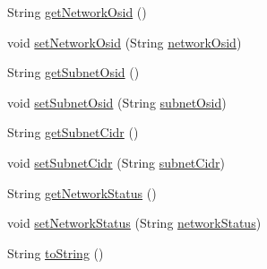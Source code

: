 \begin{DoxyCompactItemize}
\item 
String \mbox{\hyperlink{classcom_1_1example_1_1demo_1_1modular_1_1_network_a21f1cd261681f241ffc2f163c22f88ab}{get\+Network\+Osid}} ()
\item 
void \mbox{\hyperlink{classcom_1_1example_1_1demo_1_1modular_1_1_network_aad93e2b24cf4fe1a7fc86acc65037cdf}{set\+Network\+Osid}} (String \mbox{\hyperlink{classcom_1_1example_1_1demo_1_1modular_1_1_network_a653e6a71d84cc5a92ab6b4446c90b64d}{network\+Osid}})
\item 
String \mbox{\hyperlink{classcom_1_1example_1_1demo_1_1modular_1_1_network_a176a534f769a35decf7daf51ae4d99d3}{get\+Subnet\+Osid}} ()
\item 
void \mbox{\hyperlink{classcom_1_1example_1_1demo_1_1modular_1_1_network_a224f3613b5b7d28c673c18c0d3dcf19e}{set\+Subnet\+Osid}} (String \mbox{\hyperlink{classcom_1_1example_1_1demo_1_1modular_1_1_network_a2f70a4f8f85e28c37af005fe18074deb}{subnet\+Osid}})
\item 
String \mbox{\hyperlink{classcom_1_1example_1_1demo_1_1modular_1_1_network_aaee5c23adf0c0face43786b53a56e035}{get\+Subnet\+Cidr}} ()
\item 
void \mbox{\hyperlink{classcom_1_1example_1_1demo_1_1modular_1_1_network_a13ce33b2ad64cc3a93c13422a68435f8}{set\+Subnet\+Cidr}} (String \mbox{\hyperlink{classcom_1_1example_1_1demo_1_1modular_1_1_network_a77c09d06140f3d9047051d6a8033c416}{subnet\+Cidr}})
\item 
String \mbox{\hyperlink{classcom_1_1example_1_1demo_1_1modular_1_1_network_a7811054d746b90753fb1b07049dc1ac3}{get\+Network\+Status}} ()
\item 
void \mbox{\hyperlink{classcom_1_1example_1_1demo_1_1modular_1_1_network_a5dcbb1a00e86153f08747c45ba56509a}{set\+Network\+Status}} (String \mbox{\hyperlink{classcom_1_1example_1_1demo_1_1modular_1_1_network_a9c13fc86c668e502aee81251ded19368}{network\+Status}})
\item 
String \mbox{\hyperlink{classcom_1_1example_1_1demo_1_1modular_1_1_network_abb7b3c92afda05d0c29aea8ec8fb2359}{to\+String}} ()
\end{DoxyCompactItemize}
